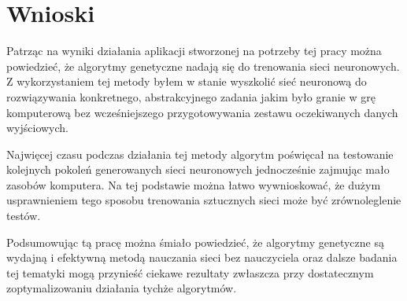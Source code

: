 \documentclass[12pt, oneside, a4paper]{report}
\begin{document}
 

\chapter{Wnioski}

Patrząc na wyniki działania aplikacji stworzonej na potrzeby tej pracy można powiedzieć, że algorytmy genetyczne nadają się do trenowania sieci neuronowych. Z wykorzystaniem tej metody byłem w stanie wyszkolić sieć neuronową do rozwiązywania konkretnego, abstrakcyjnego zadania jakim było granie w grę komputerową bez wcześniejszego przygotowywania zestawu oczekiwanych danych wyjściowych.

Najwięcej czasu podczas działania tej metody algorytm poświęcał na testowanie kolejnych pokoleń generowanych sieci neuronowych jednocześnie zajmując mało zasobów komputera. Na tej podstawie można łatwo wywnioskować, że dużym usprawnieniem tego sposobu trenowania sztucznych sieci może być zrównoleglenie testów.

Podsumowując tą pracę można śmiało powiedzieć, że algorytmy genetyczne są wydajną i efektywną metodą nauczania sieci bez nauczyciela oraz dalsze badania tej tematyki mogą przynieść ciekawe rezultaty zwłaszcza przy dostatecznym zoptymalizowaniu działania tychże algorytmów.

\pagebreak


\end{document}
